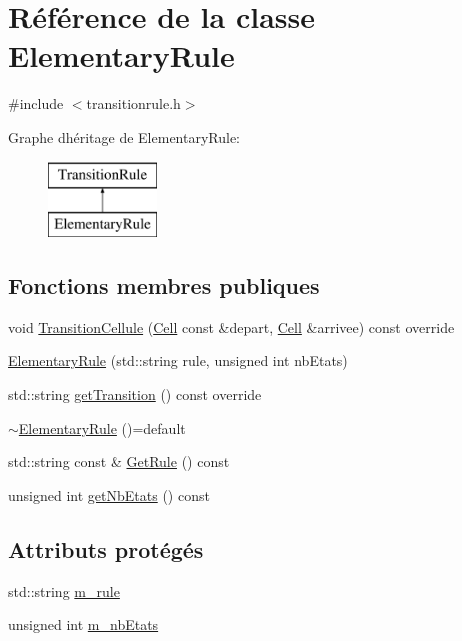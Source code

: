 \hypertarget{class_elementary_rule}{}\section{Référence de la classe Elementary\+Rule}
\label{class_elementary_rule}


{\ttfamily \#include $<$transitionrule.\+h$>$}

Graphe d\textquotesingle{}héritage de Elementary\+Rule\+:\begin{figure}[H]
\begin{center}
\leavevmode
\includegraphics[height=2.000000cm]{class_elementary_rule}
\end{center}
\end{figure}
\subsection*{Fonctions membres publiques}
\begin{DoxyCompactItemize}
\item 
void \mbox{\hyperlink{class_elementary_rule_a38451269153546c9d374f7f6df8cde6d}{Transition\+Cellule}} (\mbox{\hyperlink{class_cell}{Cell}} const \&depart, \mbox{\hyperlink{class_cell}{Cell}} \&arrivee) const override
\item 
\mbox{\hyperlink{class_elementary_rule_ac8eefc3857eaa13b7a2c089baf8e16fd}{Elementary\+Rule}} (std\+::string rule, unsigned int nb\+Etats)
\item 
std\+::string \mbox{\hyperlink{class_elementary_rule_aa214ba2de95a61390947a550a39937bb}{get\+Transition}} () const override
\item 
\mbox{\hyperlink{class_elementary_rule_a3c2ace44ee7f555e2a2e624a38c10451}{$\sim$\+Elementary\+Rule}} ()=default
\item 
std\+::string const  \& \mbox{\hyperlink{class_elementary_rule_aa613ebf61f261d5e4d36d1133a975567}{Get\+Rule}} () const
\item 
unsigned int \mbox{\hyperlink{class_elementary_rule_aab53797244e56188202958798458a409}{get\+Nb\+Etats}} () const
\end{DoxyCompactItemize}
\subsection*{Attributs protégés}
\begin{DoxyCompactItemize}
\item 
std\+::string \mbox{\hyperlink{class_elementary_rule_a08733bd5dfc8395606006d513972f6c0}{m\+\_\+rule}}
\item 
unsigned int \mbox{\hyperlink{class_elementary_rule_ad43275c71994202ab057d35953e8bd23}{m\+\_\+nb\+Etats}}
\end{DoxyCompactItemize}


